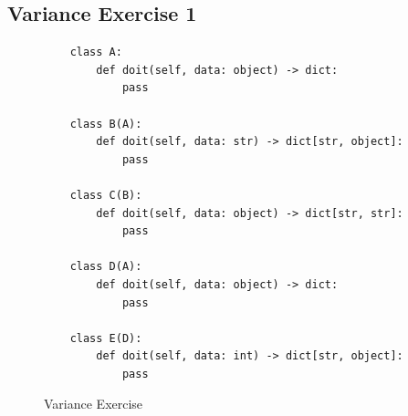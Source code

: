 \documentclass[oneside,11pt,dvipsnames]{book}
\newcommand{\code}[1]{\texttt{#1}}
\begin{document}












\subsection{Variance Exercise 1}\label{ex:variance1}

\begin{figure}
    \begin{lstlisting}
    class A:
        def doit(self, data: object) -> dict:
            pass
    
    class B(A):
        def doit(self, data: str) -> dict[str, object]:
            pass
    
    class C(B):
        def doit(self, data: object) -> dict[str, str]:
            pass
    
    class D(A):
        def doit(self, data: object) -> dict:
            pass
    
    class E(D):
        def doit(self, data: int) -> dict[str, object]:
            pass
    \end{lstlisting}
    \caption{Variance Exercise}\label{fig:variance1}    
\end{figure}
\end{document}

